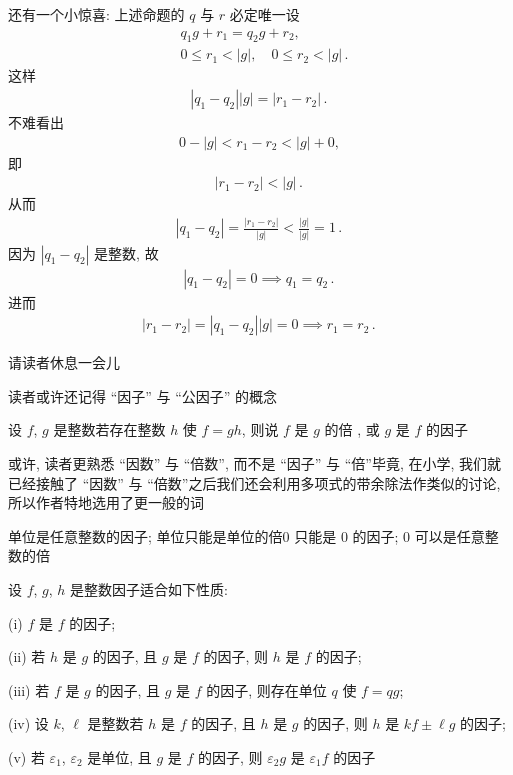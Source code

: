 还有一个小惊喜: 上述命题的 $q$ 与 $r$ 必定唯一\period 设
\begin{align*}
     & q_1 g + r_1 = q_2 g + r_2,                       \\
     & 0 \leq r_1 < |g|, \quad 0 \leq r_2 < |g| \period
\end{align*}
这样
\begin{align*}
    |q_1 - q_2| |g| = |r_1 - r_2| \period
\end{align*}
不难看出
\begin{align*}
    0 - |g| < r_1 - r_2 < |g| + 0,
\end{align*}
即
\begin{align*}
    |r_1 - r_2| < |g| \period
\end{align*}
从而
\begin{align*}
    |q_1 - q_2| = \frac{|r_1 - r_2|}{|g|} < \frac{|g|}{|g|} = 1 \period
\end{align*}
因为 $|q_1 - q_2|$ 是整数, 故
\begin{align*}
    |q_1 - q_2| = 0 \implies q_1 = q_2 \period
\end{align*}
进而
\begin{align*}
    |r_1 - r_2| = |q_1 - q_2| |g| = 0 \implies r_1 = r_2 \period
\end{align*}

请读者休息一会儿\period

\myLine

读者或许还记得 ``因子'' 与 ``公因子'' 的概念\period
\begin{definition}
    设 $f$, $g$ 是整数\period 若存在整数 $h$ 使 $f=gh$, 则说 $f$ 是 $g$ 的倍 , 或 $g$ 是 $f$ 的因子 \period
\end{definition}

\begin{remark}
    或许, 读者更熟悉 ``因数'' 与 ``倍数'', 而不是 ``因子'' 与 ``倍''\period 毕竟, 在小学, 我们就已经接触了 ``因数'' 与 ``倍数''\period 之后我们还会利用多项式的带余除法作类似的讨论, 所以作者特地选用了更一般的词\period
\end{remark}

\begin{example}
    单位是任意整数的因子; 单位只能是单位的倍\period $0$ 只能是 $0$ 的因子; $0$ 可以是任意整数的倍\period
\end{example}

\begin{proposition}
    设 $f$, $g$, $h$ 是整数\period 因子适合如下性质:

    (i) $f$ 是 $f$ 的因子;

    (ii) 若 $h$ 是 $g$ 的因子, 且 $g$ 是 $f$ 的因子, 则 $h$ 是 $f$ 的因子;

    (iii) 若 $f$ 是 $g$ 的因子, 且 $g$ 是 $f$ 的因子, 则存在单位 $q$ 使 $f = qg$;

    (iv) 设 $k$, $\ell$ 是整数\period 若 $h$ 是 $f$ 的因子, 且 $h$ 是 $g$ 的因子, 则 $h$ 是 $kf \pm \ell g$ 的因子;

    (v) 若 $\varepsilon_1$, $\varepsilon_2$ 是单位, 且 $g$ 是 $f$ 的因子, 则 $\varepsilon_2 g$ 是 $\varepsilon_1 f$ 的因子\period
\end{proposition}

